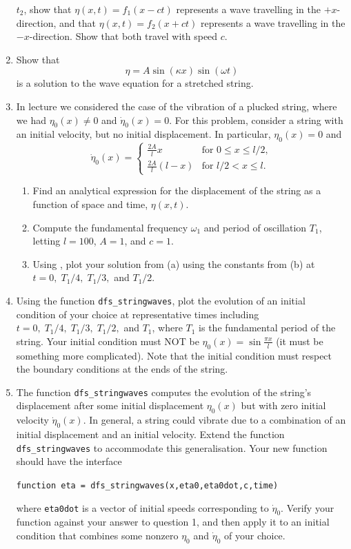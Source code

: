 \documentclass[12pt,twoside,a4paper]{article}
\begin{document}
\begin{enumerate}
  $t_2$, show that $\eta(x,t) = f_1(x-ct)$ represents a wave
  travelling in the $+x$-direction, and that $\eta(x,t) = f_2(x+ct)$
  represents a wave travelling in the $-x$-direction.  Show that both
  travel with speed $c$.
\item Show that
  \begin{displaymath}
    \eta = A \sin(\kappa x)\sin(\omega t)
  \end{displaymath}
  is a solution to the wave equation for a stretched string.
\item In lecture we considered the case of the vibration of a plucked
  string, where we had $\eta_0(x)\ne0$ and $\dot{\eta}_0(x)=0$.  For
  this problem, consider a string with an initial velocity, but no
  initial displacement. In particular, $\eta_0(x)=0$ and
  \begin{displaymath}
    \dot{\eta}_0(x) =
    \begin{cases}
      \frac{2A}{l}x & \text{for $0\le x\le l/2$},\\
      \frac{2A}{l}(l-x) & \text{for $l/2 < x\le l$}.
    \end{cases}
  \end{displaymath}
  \begin{enumerate}
  \item Find an analytical expression for the displacement of the
    string as a function of space and time, $\eta(x,t)$.
  \item Compute the fundamental frequency $\omega_1$ and period of
    oscillation $T_1$, letting $l=100$, $A=1$, and $c=1$.
  \item Using \Mlab, plot your solution from (a) using the constants
    from (b) at $t = 0,\; T_1/4,\; T_1/3,$ and $T_1/2$.
  \end{enumerate}
\item Using the \Mlab function \texttt{dfs\_stringwaves}, plot the
  evolution of an initial condition of your choice at representative
  times including $t=0,\; T_1/4,\; T_1/3,\; T_1/2,$ and $T_1$, where
  $T_1$ is the fundamental period of the string.  Your initial
  condition must NOT be $\eta_0(x) = \sin\frac{\pi x}{l}$ (it must be
  something more complicated).  Note that the initial condition must
  respect the boundary conditions at the ends of the string.
\item The function \texttt{dfs\_stringwaves} computes the evolution of
  the string's displacement after some initial displacement
  $\eta_0(x)$ but with zero initial velocity $\dot{\eta}_0(x)$.  In
  general, a string could vibrate due to a combination of an initial
  displacement and an initial velocity.  Extend the function
  \texttt{dfs\_stringwaves} to accommodate this generalisation.  Your
  new function should have the interface
  \begin{center}
    \texttt{function eta = dfs\_stringwaves(x,eta0,eta0dot,c,time)}
  \end{center}
  where \texttt{eta0dot} is a vector of initial speeds corresponding
  to $\dot{\eta}_0$. Verify your function against your answer to
  question 1, and then apply it to an initial condition that combines
  some nonzero $\eta_0$ and $\dot{\eta}_0$ of your choice.
\end{enumerate}
\end{document}
